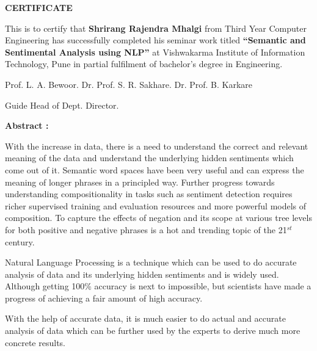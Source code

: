 \documentclass{article} %
\begin{document}
\textbf{CERTIFICATE}

 

This is to certify that \textbf{Shrirang Rajendra Mhalgi }from Third Year Computer Engineering has successfully completed his seminar work titled \textbf{``Semantic and Sentimental Analysis using NLP''} at Vishwakarma Institute of Information Technology, Pune in partial fulfilment of bachelor's degree in Engineering.





\noindent 

\noindent Prof. L. A. Bewoor.                      Dr. Prof. S. R. Sakhare.                   Dr. Prof. B. Karkare

\noindent          Guide                                           Head of Dept.                                     Director.

\noindent 

\noindent 

\noindent 

\noindent 

\noindent 

\noindent 

\noindent 

\noindent 

\noindent \eject 

\noindent \textbf{Abstract :}

With the increase in data, there is a need to understand the correct and relevant meaning of the data and understand the underlying hidden sentiments which come out of it. Semantic word spaces have been very useful and can express the meaning of longer phrases in a principled way. Further progress towards understanding compositionality in tasks such as sentiment detection requires richer supervised training and evaluation resources and more powerful models of composition. To capture the effects of negation and its scope at various tree levels for both positive and negative phrases is a hot and trending topic of the 21${}^{st}$ century. 

Natural Language Processing is a technique which can be used to do accurate analysis of data and its underlying hidden sentiments and is widely used. Although getting 100\% accuracy is next to impossible, but scientists have made a progress of achieving a fair amount of high accuracy. 

With the help of accurate data, it is much easier to do actual and accurate analysis of data which can be further used by the experts to derive much more concrete results.
\end{document}
